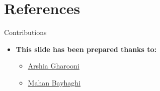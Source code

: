 \documentclass[serif, aspectratio=169]{beamer}
\begin{document}
\section{References}

\begin{frame}{Contributions}
\begin{itemize}
\item \textbf{This slide has been prepared thanks to:}
\begin{itemize}
    \setlength{\itemsep}{10pt} %
    \item \href{https://silentdrift.github.io/}{Arshia Gharooni}
    \item \href{https://github.com/Mahan-Bayhaghi}{Mahan Bayhaghi}
\end{itemize}
\end{itemize}

\end{frame}

\begin{frame}[allowframebreaks]
    
    
    \nocite{*}
\end{frame}
\end{document}
